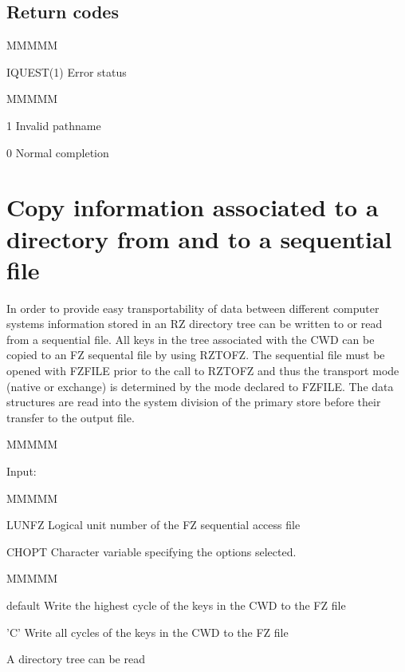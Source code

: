 \subsection{Return codes}
\begin{DL}{MMMMM}
\item[IQUEST(1)
]Error status
\begin{DL}{MMMMM}
\item[ 1
]Invalid pathname
\item[ 0
]Normal completion
\end{DL}
\end{DL}
\section{Copy information associated to a directory from and to a sequential file}
\par In order to provide
easy transportability of data between different computer
systems information stored in an RZ directory tree can
be written to or read from a sequential file.
All keys in the tree associated with the CWD can be copied
to an FZ sequental file by using RZTOFZ.
The sequential file must be opened with FZFILE prior to
the call to RZTOFZ and thus the transport mode (native or exchange)
is determined by the mode declared to FZFILE.
The data structures are read into the system division of the
primary store before their transfer to the output file.
\begin{DL}{MMMMM}
\item[Input:
]
\begin{DL}{MMMMM}
\item[LUNFZ
]Logical unit number of the FZ sequential access file
\item[CHOPT
]Character variable specifying the options selected.
\begin{DL}{MMMMM}
\item[default
]Write the highest cycle of the keys in the CWD to the FZ file
\item['C'
]Write all cycles of the keys in the CWD to the FZ file
\end{DL}
\end{DL}
\end{DL}
\par A directory tree can be read
